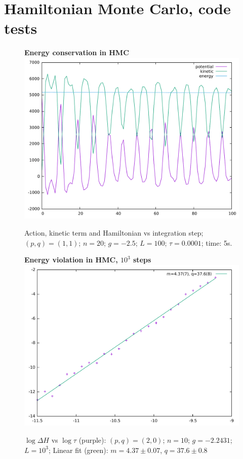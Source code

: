 \documentclass[12pt,a4paper]{article}
\begin{document}
\section{Hamiltonian Monte Carlo, code tests}

\begin{figure}[!htb]
\centering
\textbf{Energy conservation in HMC}
\includegraphics[width=1\linewidth]{env.pdf}
\caption{Action, kinetic term and Hamiltonian vs integration step; $(p,q)=(1,1)$; $n=20$; $g=-2.5$; $L=100$; $\tau = 0.0001$; time: 5s.}
\end{figure}

\begin{figure}[!htb]
\centering
\textbf{Energy violation in HMC, $10^3$ steps}
\includegraphics[width=1\linewidth]{quadratic103.pdf}
\caption{$\log \Delta H$ vs $\log \tau$ (purple): $(p,q)=(2,0)$; $n=10$; $g=-2.2431$; $L=10^3$; Linear fit (green): $m=4.37 \pm 0.07$, $q = 37.6 \pm 0.8$}
\end{figure}
\end{document}
